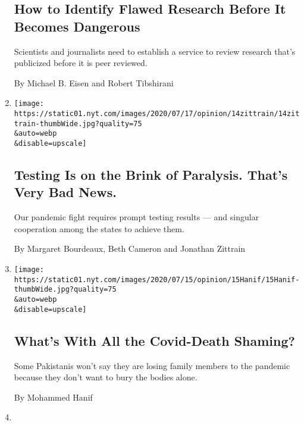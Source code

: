 \begin{enumerate}
  \hypertarget{how-to-identify-flawed-research-before-it-becomes-dangerous}{%
  \subsection{How to Identify Flawed Research Before It Becomes
  Dangerous}\label{how-to-identify-flawed-research-before-it-becomes-dangerous}}

  Scientists and journalists need to establish a service to review
  research that's publicized before it is peer reviewed.

  By Michael B. Eisen and Robert Tibshirani
\item
  \href{/2020/07/16/opinion/coronavirus-testing-us.html}{}

  \texttt{[image: https://static01.nyt.com/images/2020/07/17/opinion/14zittrain/14zittrain-thumbWide.jpg?quality=75\\\&auto=webp\\\&disable=upscale]}

  \hypertarget{testing-is-on-the-brink-of-paralysis-thats-very-bad-news}{%
  \subsection{Testing Is on the Brink of Paralysis. That's Very Bad
  News.}\label{testing-is-on-the-brink-of-paralysis-thats-very-bad-news}}

  Our pandemic fight requires prompt testing results --- and singular
  cooperation among the states to achieve them.

  By Margaret Bourdeaux, Beth Cameron and Jonathan Zittrain
\item
  \href{/2020/07/16/opinion/coronavirus-pakistan-death.html}{}

  \texttt{[image: https://static01.nyt.com/images/2020/07/15/opinion/15Hanif/15Hanif-thumbWide.jpg?quality=75\\\&auto=webp\\\&disable=upscale]}

  \hypertarget{whats-with-all-the-covid-death-shaming}{%
  \subsection{What's With All the Covid-Death
  Shaming?}\label{whats-with-all-the-covid-death-shaming}}

  Some Pakistanis won't say they are losing family members to the
  pandemic because they don't want to bury the bodies alone.

  By Mohammed Hanif
\item
  \href{/2020/07/14/opinion/coronavirus-shutdown.html}{}


\end{enumerate}
